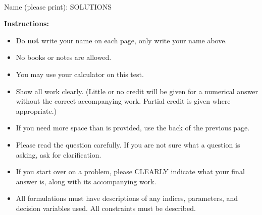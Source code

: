 \documentclass[12pt]{article}
\begin{document}
 \pagestyle{empty}






\newpage


\noindent



 \\

\smskip



\vspace{1.0cm}
\noindent
Name (please print): SOLUTIONS \vspace{1cm}


\noindent
{\bf Instructions:}
\\
\begin{itemize}
\item Do {\bf not} write your name on each page, only write your name above.

\item No books or notes %
 are allowed. %

\item You may use your calculator on this test.

\item Show all work clearly. (Little or no credit will be given for a numerical
answer without the correct accompanying work.
Partial credit is given where appropriate.) 

\item If you need more space than is provided, use the back of the previous page. 

\item Please read the question carefully.
If you are not sure what a question is
asking, ask for clarification.

\item If you start over on a problem, please CLEARLY indicate what your final
  answer is, along with its accompanying work.

\item All formulations must have descriptions of any indices, parameters, and decision variables used. All constraints must be described. 
\end{itemize}
\end{document}
